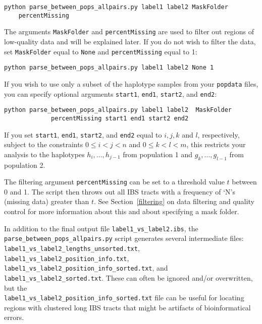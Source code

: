 \documentclass[12pt]{article}
\begin{document}
\begin{enumerate}
\begin{Verbatim}
python parse_between_pops_allpairs.py label1 label2 MaskFolder 
	percentMissing 
\end{Verbatim}

The arguments \texttt{MaskFolder} and \texttt{percentMissing} are used to filter out regions of low-quality data and will be explained later. If you do not wish to filter the data, set \texttt{MaskFolder} equal to \texttt{None} and \texttt{percentMissing} equal to 1:

\begin{verbatim}
python parse_between_pops_allpairs.py label1 label2 None 1
\end{verbatim}

If you wish to use only a subset of the haplotype samples from your \texttt{popdata} files, you can specify optional arguments \texttt{start1}, \texttt{end1}, \texttt{start2}, and \texttt{end2}:

\begin{Verbatim}
python parse_between_pops_allpairs.py label1 label2  MaskFolder 
			 percentMissing start1 end1 start2 end2
\end{Verbatim}

If you set \texttt{start1}, \texttt{end1}, \texttt{start2}, and \texttt{end2} equal to $i,j,k$ and $l$, respectively, subject to the constraints $0\leq i<j<n$ and $0\leq k<l<m$, this restricts your analysis to the haplotypes $h_i,\ldots,h_{j-1}$ from population 1 and $g_k,\ldots,g_{l-1}$ from population 2. 

The filtering argument \texttt{percentMissing} can be set to a threshold value $t$ between 0 and 1. The script then throws out all IBS tracts with a frequency of `N's (missing data) greater than $t$. See Section~\ref{filtering} on data filtering and quality control for more information about this and about specifying a mask folder.

In addition to the final output file \verb|label1_vs_label2.ibs|, the \\ \noindent \verb|parse_between_pops_allpairs.py| script generates several intermediate files:  \verb|label1_vs_label2_lengths_unsorted.txt|, \\ \noindent  \verb|label1_vs_label2_position_info.txt|,  \\ \noindent \verb|label1_vs_label2_position_info_sorted.txt|, and  \verb|label1_vs_label2_sorted.txt|. These can often be ignored and/or overwritten, but the \\ \noindent
\verb|label1_vs_label2_position_info_sorted.txt| file can be useful for locating regions with clustered long IBS tracts that might be artifacts of bioinformatical errors.


\end{enumerate}
\end{document}
